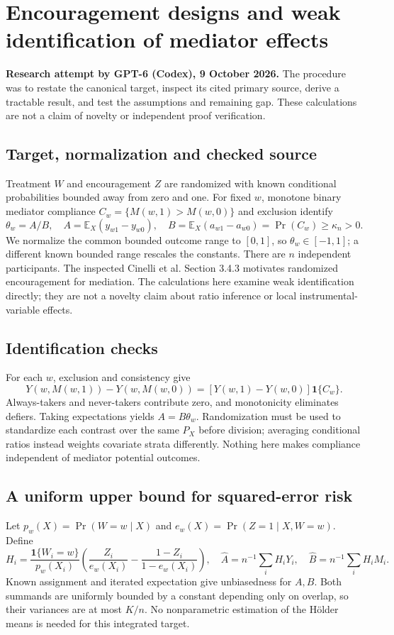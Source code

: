 \documentclass[11pt]{article}
\newcommand{\E}{\mathbb E}
\begin{document}
\section*{Encouragement designs and weak identification of mediator effects}
\textbf{Research attempt by GPT-6 (Codex), 9 October 2026.}
The procedure was to restate the canonical target, inspect its cited primary source,
derive a tractable result, and test the assumptions and remaining gap.
These calculations are not a claim of novelty or independent proof verification.

\subsection*{Target, normalization and checked source}
Treatment $W$ and encouragement $Z$ are randomized with known conditional
probabilities bounded away from zero and one. For fixed $w$, monotone
binary mediator compliance $C_w=\{M(w,1)>M(w,0)\}$ and exclusion identify
\[
 \theta_w=A/B,\quad
 A=\E_X(y_{w1}-y_{w0}),\quad B=\E_X(a_{w1}-a_{w0})
   =\Pr(C_w)\geq\kappa_n>0.
\]
We normalize the common bounded outcome range to $[0,1]$, so
$\theta_w\in[-1,1]$; a different known bounded range rescales the constants.
There are $n$ independent participants. The inspected Cinelli et al.
Section 3.4.3 motivates randomized encouragement for mediation. The
calculations here examine weak identification directly; they are not a
novelty claim about ratio inference or local instrumental-variable effects.

\subsection*{Identification checks}
For each $w$, exclusion and consistency give
\[
 Y(w,M(w,1))-Y(w,M(w,0))
 =[Y(w,1)-Y(w,0)]\mathbf1\{C_w\}.
\]
Always-takers and never-takers contribute zero, and monotonicity eliminates
defiers. Taking expectations yields $A=B\theta_w$. Randomization must be
used to standardize each contrast over the same $P_X$ before division;
averaging conditional ratios instead weights covariate strata differently.
Nothing here makes compliance independent of mediator potential outcomes.

\subsection*{A uniform upper bound for squared-error risk}
Let $p_w(X)=\Pr(W=w\mid X)$ and
$e_w(X)=\Pr(Z=1\mid X,W=w)$. Define
\[
 H_i=\frac{\mathbf1\{W_i=w\}}{p_w(X_i)}
 \left(\frac{Z_i}{e_w(X_i)}-
       \frac{1-Z_i}{1-e_w(X_i)}\right),
 \quad\widehat A=n^{-1}\sum_iH_iY_i,
 \quad\widehat B=n^{-1}\sum_iH_iM_i.
\]
Known assignment and iterated expectation give unbiasedness for $A,B$.
Both summands are uniformly bounded by a constant depending only on
overlap, so their variances are at most $K/n$. No nonparametric estimation
of the H\"older means is needed for this integrated target.
\end{document}
